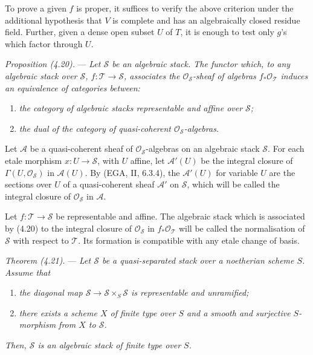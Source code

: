 \documentclass[10pt]{article}
\newcommand{\cO}{\mathcal O}
\begin{document}
To prove a given $f$ is proper, it suffices to verify the above criterion under the additional hypothesis that $V$ is complete and has an algebraically closed residue field. Further, given a dense open subset $U$ of $T$, it is enough to test only $g$'s which factor through $U$.

\medskip
\noindent\emph{Proposition (4.20).} --- \emph{Let $\mathscr S$ be an algebraic stack. The functor which, to any algebraic stack over $\mathscr S$, $f:\mathscr T\to\mathscr S$, associates the $\cO_{\mathscr S}$-sheaf of algebras $f_*\cO_{\mathscr T}$ induces an equivalence of categories between:}
\begin{enumerate}[label=(\roman*)]
\item \emph{the category of algebraic stacks representable and affine over $\mathscr S$;}
\item \emph{the dual of the category of quasi-coherent $\cO_{\mathscr S}$-algebras.}
\end{enumerate}

Let $\mathscr A$ be a quasi-coherent sheaf of $\cO_{\mathscr S}$-algebras on an algebraic stack $\mathscr S$. For each etale morphism $x:U\to\mathscr S$, with $U$ affine, let $\mathscr A'(U)$ be the integral closure of $\Gamma(U,\cO_{\mathscr S})$ in $\mathscr A(U)$. By (EGA, II, 6.3.4), the $\mathscr A'(U)$ for variable $U$ are the sections over $U$ of a quasi-coherent sheaf $\mathscr A'$ on $\mathscr S$, which will be called the integral closure of $\cO_{\mathscr S}$ in $\mathscr A$.

Let $f:\mathscr T\to\mathscr S$ be representable and affine. The algebraic stack which is associated by (4.20) to the integral closure of $\cO_{\mathscr S}$ in $f_*\cO_{\mathscr T}$ will be called the normalisation of $\mathscr S$ with respect to $\mathscr T$. Its formation is compatible with any etale change of basis.

\medskip
\noindent\emph{Theorem (4.21).} --- \emph{Let $\mathscr S$ be a quasi-separated stack over a noetherian scheme $S$. Assume that}
\begin{enumerate}[label=(\roman*)]
\item \emph{the diagonal map $\mathscr S\to\mathscr S\times_S\mathscr S$ is representable and unramified;}
\item \emph{there exists a scheme $X$ of finite type over $S$ and a smooth and surjective $S$-morphism from $X$ to $\mathscr S$.}
\end{enumerate}
\emph{Then, $\mathscr S$ is an algebraic stack of finite type over $S$.}
\end{document}
